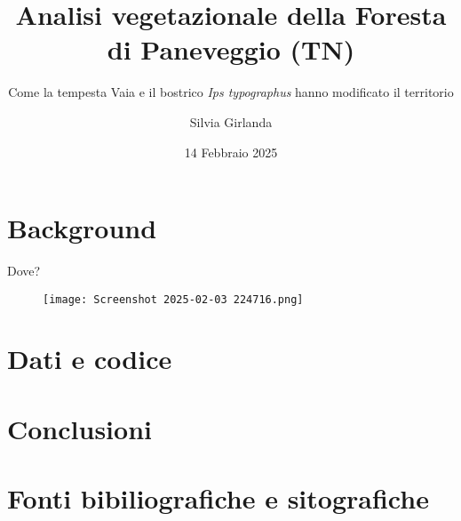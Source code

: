 \documentclass{beamer} %
\title{Analisi vegetazionale della Foresta di Paneveggio (TN)}
\subtitle {Come la tempesta Vaia e il bostrico \textit{Ips typographus} hanno modificato il territorio }
\author{Silvia Girlanda}
\date{14 Febbraio 2025}
\begin{document}
\maketitle



\section{Background}

\begin{frame}{Dove?}
\begin{figure}
    \centering
    \texttt{[image: Screenshot 2025-02-03 224716.png]}
\end{figure}
\end{frame}

\section{Dati e codice}

\section{Conclusioni}

\section{Fonti bibiliografiche e sitografiche}
\end{document}
